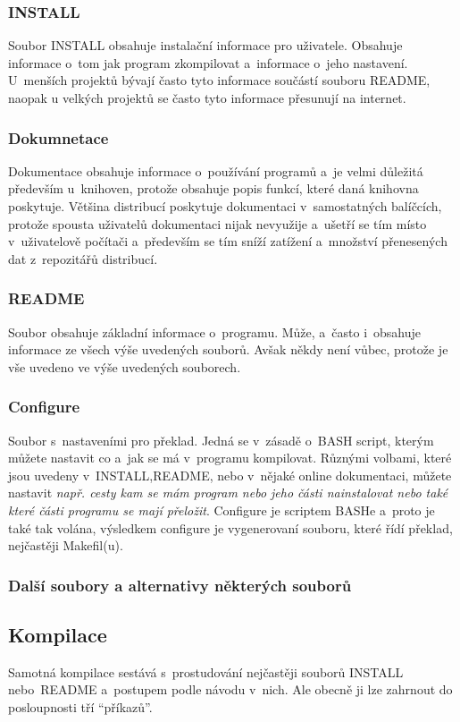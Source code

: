 \documentclass[a4paper,12pt]{article}
\renewcommand{\it}[1]{\textit{#1}}		%
\begin{document}
\subsubsection{INSTALL}
Soubor INSTALL obsahuje instalační informace pro uživatele. Obsahuje informace o~tom jak program zkompilovat a~informace o~jeho nastavení. U~menších projektů bývají často tyto informace součástí souboru README, naopak u velkých projektů se často tyto informace přesunují na internet.
\subsubsection{Dokumnetace}
Dokumentace obsahuje informace o~používání programů a~je velmi důležitá především u~knihoven, protože obsahuje popis funkcí, které daná knihovna poskytuje. Většina distribucí poskytuje dokumentaci v~samostatných balíčcích, protože spousta uživatelů dokumentaci nijak nevyužije a~ušetří se tím místo v~uživatelově počítači a~především se tím sníží zatížení a~množství přenesených dat z~repozitářů distribucí.
\subsubsection{README}
Soubor obsahuje základní informace o~programu. Může, a~často i~obsahuje informace ze všech výše uvedených souborů. Avšak někdy není vůbec, protože je vše uvedeno ve výše uvedených souborech.
\subsubsection{Configure}
Soubor s~nastaveními pro překlad. Jedná se v~zásadě o~BASH script, kterým můžete nastavit co a~jak se má v~programu kompilovat. Různými volbami, které jsou uvedeny v~INSTALL,README, nebo v~nějaké online dokumentaci, můžete nastavit \it{např. cesty kam se mám program nebo jeho části nainstalovat nebo také které části programu se mají přeložit}. Configure je scriptem BASHe a~proto je také tak volána, výsledkem configure je vygenerovaní souboru, které řídí překlad, nejčastěji Makefil(u).
\subsubsection{Další soubory a alternativy některých souborů}

\subsection{Kompilace}
Samotná kompilace sestává s~prostudování nejčastěji souborů INSTALL nebo README a~postupem podle návodu v~nich. Ale obecně ji lze zahrnout do posloupnosti tří ``příkazů''.
\end{document}
